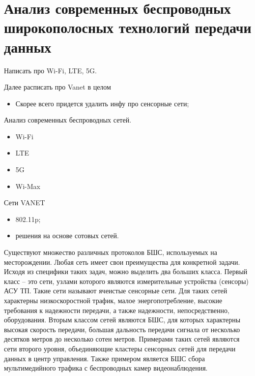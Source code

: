 \section{Анализ современных беспроводных широкополосных технологий 
передачи данных}

Написать про Wi-Fi, LTE, 5G.

Далее расписать про Vanet в целом 

\begin{itemize}
  \item Скорее всего придется удалить инфу про сенсорные сети;
\end{itemize}

Анализ современных беспроводных сетей.
\begin{itemize}
  \item Wi-Fi
  \item LTE
  \item 5G
  \item Wi-Max
\end{itemize}

Сети VANET
\begin{itemize}
  \item 802.11p;
  \item решения на основе сотовых сетей.
\end{itemize}


Существуют множество различных протоколов БШС, используемых на месторождении. Любая сеть имеет свои преимущества для конкретной задачи. Исходя из специфики таких задач, можно выделить два больших класса. Первый класс -- это сети, узлами которого являются измерительные устройства (сенсоры) АСУ ТП. Такие сети называют  ячеистые сенсорные сети. Для таких сетей характерны низкоскоростной трафик, малое энергопотребление, высокие требования к надежности передачи, а также надежности, непосредственно,  оборудования. Вторым классом сетей являются БШС, для которых  характерны высокая скорость передачи, большая дальность передачи сигнала от несколько десятков метров до несколько сотен метров. Примерами таких сетей являются сети второго уровня, объединяющие кластеры сенсорных сетей для передачи данных в центр управления. Также примером является БШС сбора мультимедийного трафика с беспроводных камер видеонаблюдения. 




